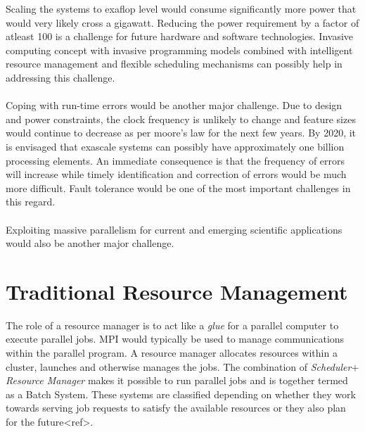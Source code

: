 Scaling the systems to exaflop level would consume significantly more power that would very likely cross a gigawatt. Reducing the power requirement by a factor of atleast 100 is a challenge for future hardware and software technologies. Invasive computing concept with invasive programming models combined with intelligent resource management and flexible scheduling mechanisms can possibly help in addressing this challenge.\\ \\
Coping with run-time errors would be another major challenge. Due to design and power constraints, the clock frequency is unlikely to change and feature sizes would continue to decrease as per moore's law for the next few years. By 2020, it is envisaged that exascale systems can possibly have approximately one billion processing elements. An immediate consequence is that the frequency of errors will increase while timely identification and correction of errors would be much more difficult. Fault tolerance would be one of the most important challenges in this regard.\\ \\
Exploiting massive parallelism for current and emerging scientific applications would also be another major challenge.
\section{Traditional Resource Management}
The role of a resource manager is to act like a \textit{glue} for a parallel computer to execute parallel jobs. MPI would typically be used to manage communications within the parallel program. A resource manager allocates resources within a cluster, launches and otherwise manages the jobs. The combination of \textit{Scheduler}$+$\textit{Resource Manager} makes it possible to run parallel jobs and is together termed as a Batch System. These systems are classified depending on whether they work towards serving job requests to satisfy the available resources or they also plan for the future<ref>.
